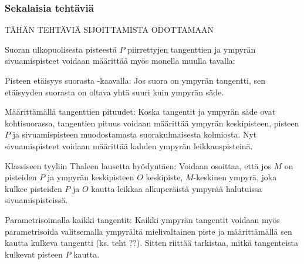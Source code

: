 \begin{tehtavasivu}
\begin{tehtava}
\begin{alakohdat}
\end{alakohdat}

\begin{vastaus}
\begin{alakohdat}
\end{alakohdat}
\end{vastaus}
\end{tehtava}

\subsubsection*{Sekalaisia tehtäviä}


TÄHÄN TEHTÄVIÄ SIJOITTAMISTA ODOTTAMAAN

\begin{tehtava}
Suoran ulkopuolisesta pisteestä $P$ piirrettyjen tangenttien ja ympyrän sivuamispisteet voidaan määrittää myös monella muulla tavalla:

Pisteen etäisyys suorasta -kaavalla: Jos suora on ympyrän tangentti, sen etäisyyden suorasta on oltava yhtä suuri kuin ympyrän säde.

Määrittämällä tangenttien pituudet: Koska tangentit ja ympyrän säde ovat kohtisuorassa, tangentien pituus voidaan määrittää ympyrän keskipisteen, pisteen $P$ ja sivuamispisteen muodostamasta suorakulmaisesta kolmiosta. Nyt sivuamispisteet voidaan määrittää kahden ympyrän leikkauspisteinä.

Klassiseen tyyliin Thaleen lausetta hyödyntäen: Voidaan osoittaa, että jos $M$ on pisteiden $P$ ja ympyrän keskipisteen $O$ keskipiste, $M$-keskinen ympyrä, joka kulkee pisteiden $P$ ja $O$ kautta leikkaa alkuperäistä ympyrää halutuissa sivuamispisteissä.

Parametrisoimalla kaikki tangentit: Kaikki ympyrän tangentit voidaan myös parametrisoida valitsemalla ympyrältä mielivaltainen piste ja määrittämällä sen kautta kulkeva tangentti (ks. teht ??). Sitten riittää tarkistaa, mitkä tangenteista kulkevat pisteen $P$ kautta.


\end{tehtava}
\end{tehtavasivu}
